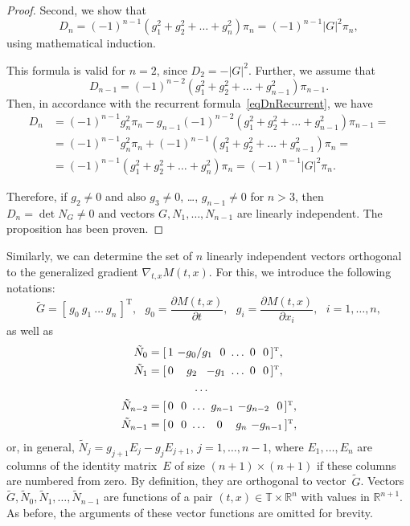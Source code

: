 \documentclass[10pt,reqno]{amsart}
\newcommand{\trans}{{\scriptscriptstyle \mathrm{T}}}
\theoremstyle{plain}
\theoremstyle{remark}
\begin{document}
\begin{proof}
Second, we show that
\[
  D_n = (-1)^{n-1} (g_1^2 + g_2^2 + \ldots + g_n^2) \pi_n = (-1)^{n-1} |G|^2 \pi_n,
\]
using mathematical induction.

This formula is valid for $n = 2$, since $D_2 = -|G|^2$. Further, we assume that
\[
  D_{n-1} = (-1)^{n-2} (g_1^2 + g_2^2 + \ldots + g_{n-1}^2) \pi_{n-1}.
\]
Then, in accordance with the recurrent formula~\eqref{eqDnRecurrent}, we have
\begin{align*}
  D_n & = (-1)^{n-1} g_n^2 \pi_n - g_{n-1} (-1)^{n-2} (g_1^2 + g_2^2 + \ldots + g_{n-1}^2) \pi_{n-1} = \\
  & = (-1)^{n-1} g_n^2 \pi_n + (-1)^{n-1} (g_1^2 + g_2^2 + \ldots + g_{n-1}^2) \pi_n = \\
  & = (-1)^{n-1} (g_1^2 + g_2^2 + \ldots + g_n^2) \pi_n = (-1)^{n-1} |G|^2 \pi_n.
\end{align*}

Therefore, if $g_2 \neq 0$ and also $g_3 \neq 0$, \dots, $g_{n-1} \neq 0$ for $n > 3$, then $D_n = \det N_G \neq 0$ and vectors $G,N_1,\dots,N_{n-1}$ are linearly independent. The proposition has been proven.
\end{proof}

Similarly, we can determine the set of $n$ linearly independent vectors orthogonal to the generalized gradient $\nabla_{t,x} M(t,x)$. For this, we introduce the following notations:
\begin{equation}\label{eqDefGTX}
  \tilde G = [ \, g_0 ~ g_1 ~ \dots ~ g_n \, ]^\trans, \ \ \ g_0 = \frac{\partial M(t,x)}{\partial t}, \ \ \
  g_i = \frac{\partial M(t,x)}{\partial x_i}, \ \ \ i = 1,\dots,n,
\end{equation}
as well as
\begin{equation}\label{eqBasisTX}
  \begin{aligned}
    \tilde N_0 & = [ \, 1 ~ {-g_0/g_1} \ \ 0 ~ \dots ~ 0 \ \ 0 \, ]^\trans, \\
    \tilde N_1 & = [ \, 0 \ \ \hskip 0.5em g_2 \hskip 0.5em ~ {-g_1} ~ \dots ~ 0 \ \ 0 \, ]^\trans, \\
    & \hskip 4em \dots \\
    \tilde N_{n-2} & = [ \, 0 \ \ 0 ~ \dots ~ g_{n-1} ~ {-g_{n-2}} \ \ 0 \, ]^\trans, \\
    \tilde N_{n-1} & = [ \, 0 \ \ 0 ~ \dots ~ \hskip 0.52em 0 \hskip 0.52em \ \ g_n ~ {-g_{n-1}} \, ]^\trans,
  \end{aligned}
\end{equation}
or, in general, $\tilde N_j = g_{j+1} E_j - g_j E_{j+1}$, $j = 1,\dots,n-1$, where $E_1,\dots,E_n$ are columns of the identity matrix~$E$ of size $(n+1) \times (n+1)$ if these columns are numbered from zero. By definition, they are orthogonal to vector~$\tilde G$. Vectors $\tilde G,\tilde N_0,\tilde N_1,\dots,\tilde N_{n-1}$ are functions of a pair $(t,x) \in \mathds{T} \times \mathds{R}^n$ with values in $\mathds{R}^{n+1}$. As before, the arguments of these vector functions are omitted for brevity.
\end{document}
